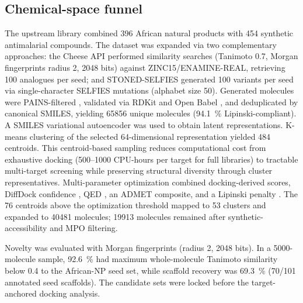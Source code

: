 \documentclass[journal=jcisd8,manuscript=article]{achemso}
\begin{document}
\subsection{Chemical-space funnel}
The upstream library combined \num{396} African natural products with \num{454} synthetic antimalarial compounds. The dataset was expanded via two complementary approaches: the Cheese API \cite{lzicar_cheese_2024} performed similarity searches (Tanimoto \num{0.7}, Morgan fingerprints radius \num{2}, \num{2048} bits) against ZINC15/ENAMINE-REAL, retrieving \num{100} analogues per seed; and STONED-SELFIES \cite{Nigam2021} generated \num{100} variants per seed via single-character SELFIES mutations (alphabet size \num{50}). Generated molecules were PAINS-filtered \cite{Baell2010}, validated via RDKit and Open Babel \cite{OBoyle2011}, and deduplicated by canonical SMILES, yielding \num{65856} unique molecules (\qty{94.1}{\percent} Lipinski-compliant). A SMILES variational autoencoder \cite{Kingma2013} was used to obtain latent representations. K-means clustering of the selected 64-dimensional representation yielded \num{484} centroids. This centroid-based sampling reduces computational cost from exhaustive docking (\numrange{500}{1000} CPU-hours per target for full libraries) to tractable multi-target screening while preserving structural diversity through cluster representatives. Multi-parameter optimization combined docking-derived scores, DiffDock confidence \cite{Corso2023}, QED \cite{Bickerton2012}, an ADMET composite, and a Lipinski penalty \cite{Lipinski2004}. The \num{76} centroids above the optimization threshold mapped to \num{53} clusters and expanded to \num{40481} molecules; \num{19913} molecules remained after synthetic-accessibility and MPO filtering.

Novelty was evaluated with Morgan fingerprints \cite{Rogers2010} (radius \num{2}, \num{2048} bits). In a \num{5000}-molecule sample, \qty{92.6}{\percent} had maximum whole-molecule Tanimoto similarity below \num{0.4} to the African-NP seed set, while scaffold recovery was \qty{69.3}{\percent} (\num{70}/\num{101} annotated seed scaffolds). The candidate sets were locked before the target-anchored docking analysis.
\end{document}
